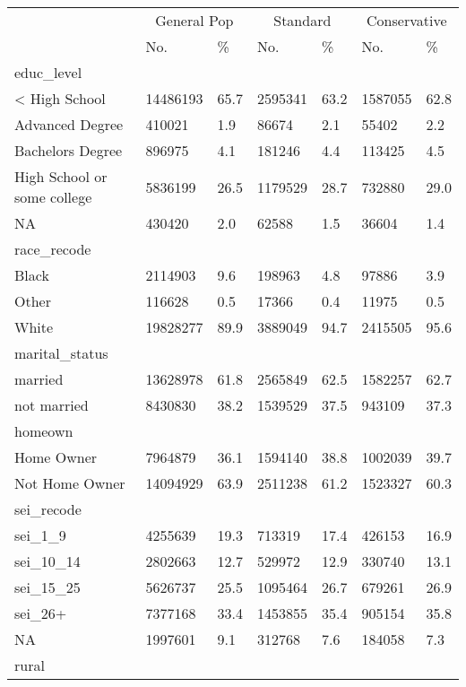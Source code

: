 \begin{tabular}{lll|ll|ll}
\toprule
& \multicolumn{2}{c}{General Pop} & \multicolumn{2}{c}{Standard} & \multicolumn{2}{c}{Conservative} \\ 
 \cmidrule(lr){2-3}\cmidrule(lr){4-5}\cmidrule(lr){6-7}
 & No. & \% & No. & \% & No. & \% \\ 
\midrule
\multicolumn{1}{l}{educ\_level} \\ 
\midrule
< High School & 14486193 & 65.7 & 2595341 & 63.2 & 1587055 & 62.8 \\ 
Advanced Degree & 410021 & 1.9 & 86674 & 2.1 & 55402 & 2.2 \\ 
Bachelors Degree & 896975 & 4.1 & 181246 & 4.4 & 113425 & 4.5 \\ 
High School or some college & 5836199 & 26.5 & 1179529 & 28.7 & 732880 & 29.0 \\ 
NA & 430420 & 2.0 & 62588 & 1.5 & 36604 & 1.4 \\ 
\midrule
\multicolumn{1}{l}{race\_recode} \\ 
\midrule
Black & 2114903 & 9.6 & 198963 & 4.8 & 97886 & 3.9 \\ 
Other & 116628 & 0.5 & 17366 & 0.4 & 11975 & 0.5 \\ 
White & 19828277 & 89.9 & 3889049 & 94.7 & 2415505 & 95.6 \\ 
\midrule
\multicolumn{1}{l}{marital\_status} \\ 
\midrule
married & 13628978 & 61.8 & 2565849 & 62.5 & 1582257 & 62.7 \\ 
not married & 8430830 & 38.2 & 1539529 & 37.5 & 943109 & 37.3 \\ 
\midrule
\multicolumn{1}{l}{homeown} \\ 
\midrule
Home Owner & 7964879 & 36.1 & 1594140 & 38.8 & 1002039 & 39.7 \\ 
Not Home Owner & 14094929 & 63.9 & 2511238 & 61.2 & 1523327 & 60.3 \\ 
\midrule
\multicolumn{1}{l}{sei\_recode} \\ 
\midrule
sei\_1\_9 & 4255639 & 19.3 & 713319 & 17.4 & 426153 & 16.9 \\ 
sei\_10\_14 & 2802663 & 12.7 & 529972 & 12.9 & 330740 & 13.1 \\ 
sei\_15\_25 & 5626737 & 25.5 & 1095464 & 26.7 & 679261 & 26.9 \\ 
sei\_26+ & 7377168 & 33.4 & 1453855 & 35.4 & 905154 & 35.8 \\ 
NA & 1997601 & 9.1 & 312768 & 7.6 & 184058 & 7.3 \\ 
\midrule
\multicolumn{1}{l}{rural} \\ 

\end{tabular}
